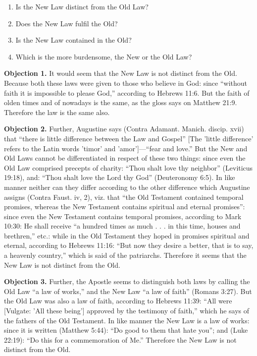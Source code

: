 
\begin{enumerate}

\item  Is the New Law distinct from the Old Law? 
\item  Does the New Law fulfil the Old? 
\item  Is the New Law contained in the Old? 
\item  Which is the more burdensome, the New or the Old Law? 
\end{enumerate}


\textbf{Objection 1.} It would seem that the New Law is not distinct from the Old. Because both these laws were given to those who believe in God: since ``without faith it is impossible to please God,'' according to Hebrews 11:6. But the faith of olden times and of nowadays is the same, as the gloss says on Matthew 21:9. Therefore the law is the same also.

\textbf{Objection 2.} Further, Augustine says (Contra Adamant. Manich. discip. xvii) that ``there is little difference between the Law and Gospel'' [The 'little difference' refers to the Latin words 'timor' and 'amor']—``fear and love.'' But the New and Old Laws cannot be differentiated in respect of these two things: since even the Old Law comprised precepts of charity: ``Thou shalt love thy neighbor'' (Leviticus 19:18), and: ``Thou shalt love the Lord thy God'' (Deuteronomy 6:5). In like manner neither can they differ according to the other difference which Augustine assigns (Contra Faust. iv, 2), viz. that ``the Old Testament contained temporal promises, whereas the New Testament contains spiritual and eternal promises'': since even the New Testament contains temporal promises, according to Mark 10:30: He shall receive ``a hundred times as much . . . in this time, houses and brethren,'' etc.: while in the Old Testament they hoped in promises spiritual and eternal, according to Hebrews 11:16: ``But now they desire a better, that is to say, a heavenly country,'' which is said of the patriarchs. Therefore it seems that the New Law is not distinct from the Old.

\textbf{Objection 3.} Further, the Apostle seems to distinguish both laws by calling the Old Law ``a law of works,'' and the New Law ``a law of faith'' (Romans 3:27). But the Old Law was also a law of faith, according to Hebrews 11:39: ``All were [Vulgate: 'All these being'] approved by the testimony of faith,'' which he says of the fathers of the Old Testament. In like manner the New Law is a law of works: since it is written (Matthew 5:44): ``Do good to them that hate you''; and (Luke 22:19): ``Do this for a commemoration of Me.'' Therefore the New Law is not distinct from the Old.

